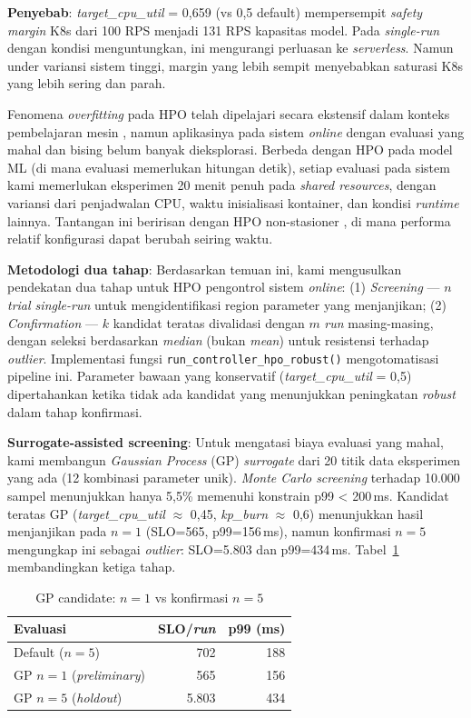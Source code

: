 \textbf{Penyebab}: \emph{target\_cpu\_util} = 0,659 (vs 0,5 default) mempersempit \emph{safety margin} K8s dari 100 RPS menjadi 131 RPS kapasitas model. Pada \emph{single-run} dengan kondisi menguntungkan, ini mengurangi perluasan ke \emph{serverless}. Namun under variansi sistem tinggi, margin yang lebih sempit menyebabkan saturasi K8s yang lebih sering dan parah.

Fenomena \emph{overfitting} pada HPO telah dipelajari secara ekstensif dalam konteks pembelajaran mesin \cite{cawley2010overfitting}, namun aplikasinya pada sistem \emph{online} dengan evaluasi yang mahal dan bising belum banyak dieksplorasi. Berbeda dengan HPO pada model ML (di mana evaluasi memerlukan hitungan detik), setiap evaluasi pada sistem kami memerlukan eksperimen 20 menit penuh pada \emph{shared resources}, dengan variansi dari penjadwalan CPU, waktu inisialisasi kontainer, dan kondisi \emph{runtime} lainnya. Tantangan ini beririsan dengan HPO non-stasioner \cite{nonstationary2022}, di mana performa relatif konfigurasi dapat berubah seiring waktu.

\textbf{Metodologi dua tahap}: Berdasarkan temuan ini, kami mengusulkan pendekatan dua tahap untuk HPO pengontrol sistem \emph{online}: (1) \emph{Screening} — $n$ \emph{trial single-run} untuk mengidentifikasi region parameter yang menjanjikan; (2) \emph{Confirmation} — $k$ kandidat teratas divalidasi dengan $m$ \emph{run} masing-masing, dengan seleksi berdasarkan \emph{median} (bukan \emph{mean}) untuk resistensi terhadap \emph{outlier}. Implementasi fungsi \texttt{run\_controller\_hpo\_robust()} mengotomatisasi pipeline ini. Parameter bawaan yang konservatif (\emph{target\_cpu\_util} = 0,5) dipertahankan ketika tidak ada kandidat yang menunjukkan peningkatan \emph{robust} dalam tahap konfirmasi.

\textbf{Surrogate-assisted screening}: Untuk mengatasi biaya evaluasi yang mahal, kami membangun \emph{Gaussian Process} (GP) \emph{surrogate} dari 20 titik data eksperimen yang ada (12 kombinasi parameter unik). \emph{Monte Carlo screening} terhadap 10.000 sampel menunjukkan hanya 5,5\% memenuhi konstrain p99 < 200\,ms. Kandidat teratas GP (\emph{target\_cpu\_util} $\approx$ 0,45, \emph{kp\_burn} $\approx$ 0,6) menunjukkan hasil menjanjikan pada $n=1$ (SLO=565, p99=156\,ms), namun konfirmasi $n=5$ mengungkap ini sebagai \emph{outlier}: SLO=5.803 dan p99=434\,ms. Tabel~\ref{tab:gp-holdout} membandingkan ketiga tahap.

\begin{table}[htbp]
    \centering
    \caption{GP candidate: $n=1$ vs konfirmasi $n=5$}
    \label{tab:gp-holdout}
    \begin{tabular}{lrr}
        \toprule
        Evaluasi & SLO/\emph{run} & p99 (ms) \\
        \midrule
        Default ($n=5$) & 702 & 188 \\
        GP $n=1$ (\emph{preliminary}) & 565 & 156 \\
        GP $n=5$ (\emph{holdout}) & 5.803 & 434 \\
        \bottomrule
    \end{tabular}
\end{table}

